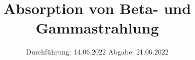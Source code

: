 

\subject{VERSUCH NUMMER 704}
\title{Absorption von Beta- und Gammastrahlung}
\date{%
  Durchführung: 14.06.2022
  \hspace{3em}
  Abgabe: 21.06.2022
}



\maketitle
\thispagestyle{empty}
\tableofcontents
\newpage






\printbibliography{}


